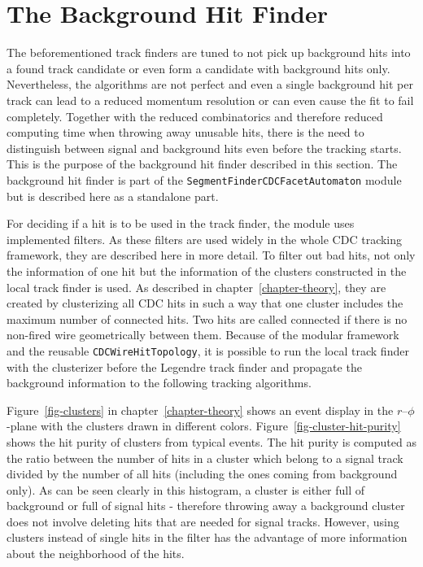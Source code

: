 \section{The Background Hit Finder} \label{section-background}
The beforementioned track finders are tuned to not pick up background hits into a found track candidate or even form a candidate with background hits only. Nevertheless, the algorithms are not perfect and even a single background hit per track can lead to a reduced momentum resolution or can even cause the fit to fail completely. Together with the reduced combinatorics and therefore reduced computing time when throwing away unusable hits, there is the need to distinguish between signal and background hits even before the tracking starts. This is the purpose of the background hit finder described in this section. The background hit finder is part of the \texttt{SegmentFinderCDCFacetAutomaton} module but is described here as a standalone part.

For deciding if a hit is to be used in the track finder, the module uses implemented filters. As these filters are used widely in the whole CDC tracking framework, they are described here in more detail. To filter out bad hits, not only the information of one hit but the information of the clusters constructed in the local track finder is used. As described in chapter~\ref{chapter-theory}, they are created by clusterizing all CDC hits in such a way that one cluster includes the maximum number of connected hits. Two hits are called connected if there is no non-fired wire geometrically between them. Because of the modular framework and the reusable \texttt{CDCWireHitTopology}, it is possible to run the local track finder with the clusterizer before the Legendre track finder and propagate the background information to the following tracking algorithms. 

Figure~\ref{fig-clusters} in chapter~\ref{chapter-theory} shows an event display in the $r$--$\phi$-plane with the clusters drawn in different colors. Figure~\ref{fig-cluster-hit-purity} shows the hit purity of clusters from typical events. The hit purity is computed as the ratio between the number of hits in a cluster which belong to a signal track divided by the number of all hits (including the ones coming from background only). As can be seen clearly in this histogram, a cluster is either full of background or full of signal hits - therefore throwing away a background cluster does not involve deleting hits that are needed for signal tracks. However, using clusters instead of single hits in the filter has the advantage of more information about the neighborhood of the hits.

